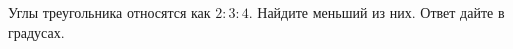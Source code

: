 \begin{ex}
	\begin{condition}
		Углы треугольника относятся как \(2:3:4\). Найдите меньший из них. Ответ дайте в градусах.
	\end{condition}
\end{ex}
